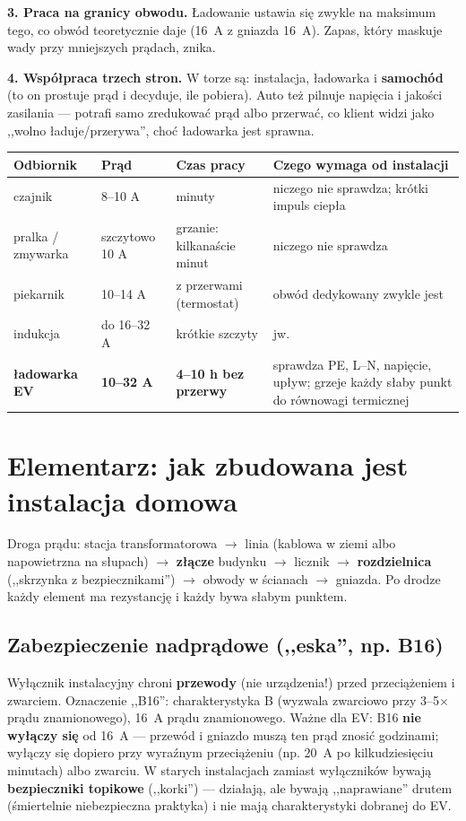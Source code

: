 \documentclass[11pt,a4paper]{article}
\begin{document}
\textbf{3. Praca na granicy obwodu.} Ładowanie ustawia się zwykle na maksimum tego, co obwód
teoretycznie daje (16~A z gniazda 16~A). Zapas, który maskuje wady przy mniejszych prądach, znika.

\textbf{4. Współpraca trzech stron.} W torze są: instalacja, ładowarka i \textbf{samochód} (to on
prostuje prąd i decyduje, ile pobiera). Auto też pilnuje napięcia i jakości zasilania --- potrafi
samo zredukować prąd albo przerwać, co klient widzi jako ,,wolno ładuje/przerywa'', choć ładowarka
jest sprawna.

\begin{longtable}{@{}p{}p{}p{}p{}@{}}
\toprule
\textbf{Odbiornik} & \textbf{Prąd} & \textbf{Czas pracy} & \textbf{Czego wymaga od instalacji}\\
\midrule
czajnik & 8--10 A & minuty & niczego nie sprawdza; krótki impuls ciepła\\
pralka / zmywarka & szczytowo 10 A & grzanie: kilkanaście minut & niczego nie sprawdza\\
piekarnik & 10--14 A & z przerwami (termostat) & obwód dedykowany zwykle jest\\
indukcja & do 16--32 A & krótkie szczyty & jw.\\
\textbf{ładowarka EV} & \textbf{10--32 A} & \textbf{4--10 h bez przerwy} & sprawdza PE, L--N, napięcie, upływ; grzeje każdy słaby punkt do równowagi termicznej\\
\bottomrule
\end{longtable}

\section{Elementarz: jak zbudowana jest instalacja domowa}
\label{sec:elementarz}
Droga prądu: stacja transformatorowa $\to$ linia (kablowa w ziemi albo napowietrzna na słupach)
$\to$ \textbf{złącze} budynku $\to$ licznik $\to$ \textbf{rozdzielnica} (,,skrzynka z bezpiecznikami'')
$\to$ obwody w ścianach $\to$ gniazda. Po drodze każdy element ma rezystancję i każdy bywa słabym
punktem.

\subsection{Zabezpieczenie nadprądowe (,,eska'', np. B16)}
Wyłącznik instalacyjny chroni \textbf{przewody} (nie urządzenia!) przed przeciążeniem i zwarciem.
Oznaczenie ,,B16'': charakterystyka B (wyzwala zwarciowo przy 3--5$\times$ prądu znamionowego),
16~A prądu znamionowego. Ważne dla EV: B16 \textbf{nie wyłączy się} od 16~A --- przewód i gniazdo
muszą ten prąd znosić godzinami; wyłączy się dopiero przy wyraźnym przeciążeniu (np. 20~A po
kilkudziesięciu minutach) albo zwarciu. W starych instalacjach zamiast wyłączników bywają
\textbf{bezpieczniki topikowe} (,,korki'') --- działają, ale bywają ,,naprawiane'' drutem
(śmiertelnie niebezpieczna praktyka) i nie mają charakterystyki dobranej do EV.
\end{document}
